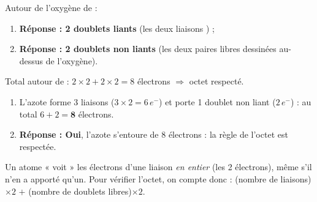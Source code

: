 \documentclass[11pt,a4paper]{article}
\newcommand{\rep}{\textbf{\textcolor{corcol}{Réponse : }}}
\begin{document}
\begin{cor}
Autour de l'oxygène de  :
\begin{enumerate}[label=\alph*),leftmargin=2em,itemsep=1pt]
  \item \rep \textbf{2 doublets liants} (les deux liaisons ) ;
  \item \rep \textbf{2 doublets non liants} (les deux paires libres dessinées au-dessus de l'oxygène).
\end{enumerate}
Total autour de  : $2\times 2 + 2\times 2 = 8$ électrons $\Rightarrow$ octet respecté.
\end{cor}

\begin{cor}
\begin{enumerate}[label=\alph*),leftmargin=2em,itemsep=1pt]
  \item L'azote forme 3 liaisons ($3\times 2 = 6\,e^-$) et porte 1 doublet non liant ($2\,e^-$) :
        au total $6 + 2 = \mathbf{8}$ électrons.
  \item \rep \textbf{Oui}, l'azote s'entoure de 8 électrons : la règle de l'octet est respectée.
\end{enumerate}
\end{cor}

\begin{astucebox}
Un atome « voit » les électrons d'une liaison \emph{en entier} (les 2 électrons), même s'il n'en
a apporté qu'un. Pour vérifier l'octet, on compte donc : \;
(nombre de liaisons)$\times 2$ $+$ (nombre de doublets libres)$\times 2$.
\end{astucebox}
\end{document}
